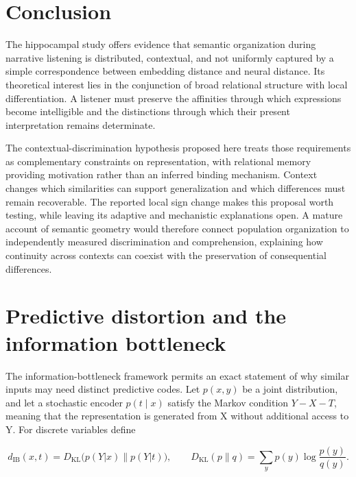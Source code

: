 \documentclass[11pt]{article}
\begin{document}
\hypertarget{conclusion}{%
\section{Conclusion}\label{conclusion}}

The hippocampal study offers evidence that semantic organization during
narrative listening is distributed, contextual, and not uniformly
captured by a simple correspondence between embedding distance and
neural distance. Its theoretical interest lies in the conjunction of
broad relational structure with local differentiation. A listener must
preserve the affinities through which expressions become intelligible
and the distinctions through which their present interpretation remains
determinate.

The contextual-discrimination hypothesis proposed here treats those
requirements as complementary constraints on representation, with
relational memory providing motivation rather than an inferred binding
mechanism. Context changes which similarities can support generalization
and which differences must remain recoverable. The reported local sign
change makes this proposal worth testing, while leaving its adaptive and
mechanistic explanations open. A mature account of semantic geometry
would therefore connect population organization to independently
measured discrimination and comprehension, explaining how continuity
across contexts can coexist with the preservation of consequential
differences.

\appendix

\hypertarget{predictive-distortion-and-the-information-bottleneck}{%
\section{Predictive distortion and the information
bottleneck}\label{predictive-distortion-and-the-information-bottleneck}}

The information-bottleneck framework permits an exact statement of why
similar inputs may need distinct predictive codes. Let \(p(x,y)\) be a
joint distribution, and let a stochastic encoder \(p(t\mid x)\) satisfy
the Markov condition \(Y-X-T\), meaning that the representation is
generated from X without additional access to Y. For discrete variables
define

\begin{equation}
d_{\mathrm{IB}}(x,t)=D_{\mathrm{KL}}\bigl(p(Y|x)\|p(Y|t)\bigr),\qquad
D_{\mathrm{KL}}(p\|q)=\sum_y p(y)\log\frac{p(y)}{q(y)}.
\end{equation}
\end{document}
